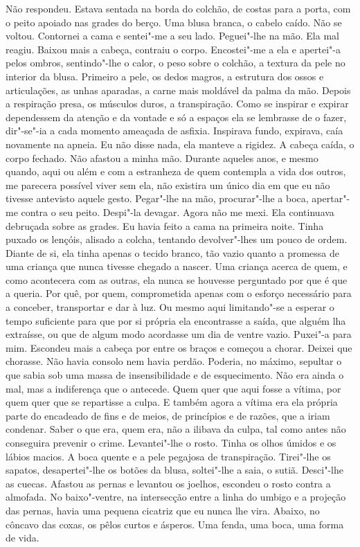 Não respondeu. Estava sentada na borda do colchão, de costas para a
porta, com o peito apoiado nas grades do berço. Uma blusa branca, o
cabelo caído. Não se voltou. Contornei a cama e sentei"-me a seu lado.
Peguei"-lhe na mão. Ela mal reagiu. Baixou mais a cabeça, contraiu o
corpo. Encostei"-me a ela e apertei"-a pelos ombros, sentindo"-lhe o
calor, o peso sobre o colchão, a textura da pele no interior da blusa.
Primeiro a pele, os dedos magros, a estrutura dos ossos e articulações,
as unhas aparadas, a carne mais moldável da palma da mão. Depois a
respiração presa, os músculos duros, a transpiração. Como se inspirar e
expirar dependessem da atenção e da vontade e só a espaços ela se
lembrasse de o fazer, dir"-se"-ia a cada momento ameaçada de asfixia.
Inspirava fundo, expirava, caía novamente na apneia. Eu não disse nada,
ela manteve a rigidez. A cabeça caída, o corpo fechado. Não afastou a
minha mão. Durante aqueles anos, e mesmo quando, aqui ou além e com a
estranheza de quem contempla a vida dos outros, me parecera possível
viver sem ela, não existira um único dia em que eu não tivesse antevisto
aquele gesto. Pegar"-lhe na mão, procurar"-lhe a boca, apertar"-me
contra o seu peito. Despi"-la devagar. Agora não me mexi. Ela continuava
debruçada sobre as grades. Eu havia feito a cama na primeira noite.
Tinha puxado os lençóis, alisado a colcha, tentando devolver"-lhes um
pouco de ordem. Diante de si, ela tinha apenas o tecido branco, tão
vazio quanto a promessa de uma criança que nunca tivesse chegado a
nascer. Uma criança acerca de quem, e como acontecera com as outras, ela
nunca se houvesse perguntado por que é que a queria. Por quê, por quem,
comprometida apenas com o esforço necessário para a conceber,
transportar e dar à luz. Ou mesmo aqui limitando"-se a esperar o tempo
suficiente para que por si própria ela encontrasse a saída, que alguém
lha extraísse, ou que de algum modo acordasse um dia de ventre vazio.
Puxei"-a para mim. Escondeu mais a cabeça por entre os braços e começou
a chorar. Deixei que chorasse. Não havia consolo nem havia perdão.
Poderia, no máximo, sepultar o que sabia sob uma massa de
insensibilidade e de esquecimento. Não era ainda o mal, mas a
indiferença que o antecede. Quem quer que aqui fosse a vítima, por quem
quer que se repartisse a culpa. E também agora a vítima era ela própria
parte do encadeado de fins e de meios, de princípios e de razões, que a
iriam condenar. Saber o que era, quem era, não a ilibava da culpa, tal
como antes não conseguira prevenir o crime. Levantei"-lhe o rosto. Tinha
os olhos úmidos e os lábios macios. A boca quente e a pele pegajosa de
transpiração. Tirei"-lhe os sapatos, desapertei"-lhe os botões da blusa,
soltei"-lhe a saia, o sutiã. Desci"-lhe as cuecas. Afastou as pernas e
levantou os joelhos, escondeu o rosto contra a almofada. No
baixo"-ventre, na intersecção entre a linha do umbigo e a projeção das
pernas, havia uma pequena cicatriz que eu nunca lhe vira. Abaixo, no
côncavo das coxas, os pêlos curtos e ásperos. Uma fenda, uma boca, uma
forma de vida.

